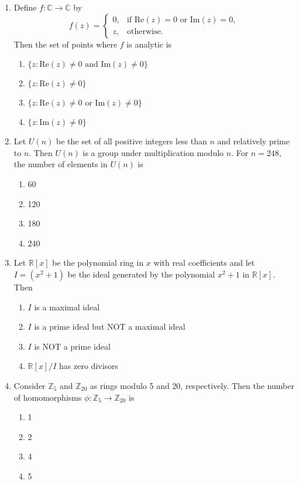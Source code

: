 \documentclass[journal]{IEEEtran}
\numberwithin{figure}{enumi}
\begin{document}
\begin{enumerate}
\item Define $f: \mathbb{C} \to \mathbb{C}$ by
\begin{equation}
f(z) =
\begin{cases}
0, & \text{if } \text{Re}(z) = 0 \text{ or Im}(z) = 0, \\
z, & \text{otherwise}.
\end{cases}
\end{equation}
Then the set of points where $f$ is analytic is
\begin{enumerate}
    \item $\{z : \text{Re}(z) \neq 0 \text{ and } \text{Im}(z) \neq 0\}$
    \item $\{z : \text{Re}(z) \neq 0\}$
    \item $\{z : \text{Re}(z) \neq 0 \text{ or } \text{Im}(z) \neq 0\}$
    \item $\{z : \text{Im}(z) \neq 0\}$
\end{enumerate}
\item Let $U(n)$ be the set of all positive integers less than $n$ and relatively prime to $n$. Then $U(n)$ is a group under multiplication modulo $n$. For $n = 248$, the number of elements in $U(n)$ is
\begin{enumerate}
    \item 60
    \item 120
    \item 180
    \item 240
\end{enumerate}

\item Let $\mathbb{R}[x]$ be the polynomial ring in $x$ with real coefficients and let $I = (x^2 + 1)$ be the ideal generated by the polynomial $x^2 + 1$ in $\mathbb{R}[x]$. Then
\begin{enumerate}
    \item $I$ is a maximal ideal
    \item $I$ is a prime ideal but NOT a maximal ideal
    \item $I$ is NOT a prime ideal
    \item $\mathbb{R}[x]/I$ has zero divisors
\end{enumerate}

\item Consider $\mathbb{Z}_5$ and $\mathbb{Z}_{20}$ as rings modulo 5 and 20, respectively. Then the number of homomorphisms $\phi: \mathbb{Z}_5 \to \mathbb{Z}_{20}$ is
\begin{enumerate}
    \item 1
    \item 2
    \item 4
    \item 5
\end{enumerate}


\end{enumerate}
\end{document}
